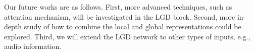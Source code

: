 \documentclass[10pt,twocolumn,letterpaper]{article}
\begin{document}
Our future works are as follows. First, more advanced techniques, such as attention mechanism, will be investigated in the LGD block. Second, more in-depth study of how to combine the local and global representations could be explored. Third, we will extend the LGD network to other types of inputs, e.g., audio information.

{\small


}
\end{document}
